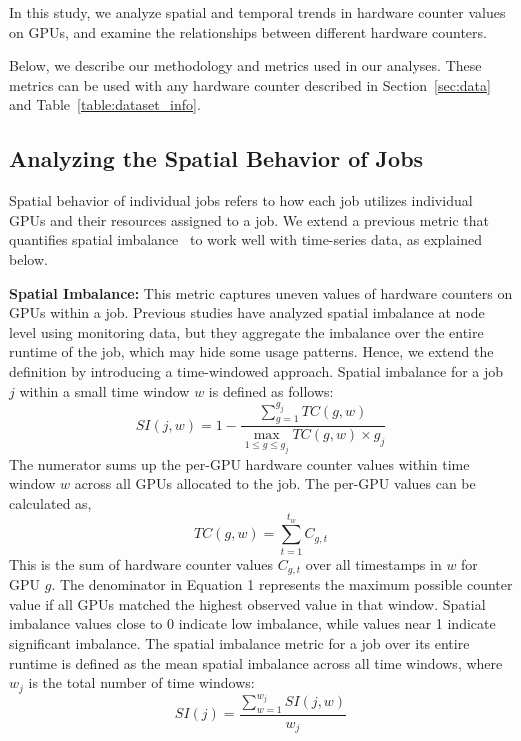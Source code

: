 In this study, we analyze spatial and temporal trends in hardware counter
values on GPUs, and examine the relationships between different hardware counters.

Below, we describe our methodology and metrics used in our analyses. These
metrics can be used with any hardware counter described in
Section~\ref{sec:data} and Table~\ref{table:dataset_info}.

\subsection{Analyzing the Spatial Behavior of Jobs}

Spatial behavior of individual jobs refers to how each job utilizes individual
GPUs and their resources assigned to a job.  We extend a previous metric that
quantifies spatial imbalance~\cite{li2023analyzing, peng2021holistic} to work
well with time-series data, as explained below.

\vspace{0.08in}
\noindent\textbf{Spatial Imbalance:}
This metric captures uneven values of hardware counters on GPUs within a job.
Previous studies have analyzed spatial imbalance at node level using monitoring data, but
they aggregate the imbalance over the entire runtime of the job, which may hide
some usage patterns.  Hence, we extend the definition by introducing a time-windowed
approach.  Spatial imbalance for a job $j$ within a small time window $w$ is defined
as follows:
%
\begin{equation}
    \mathit{SI}(j, w) = 1 - \frac{\sum_{g=1}^{g_j} \mathit{TC}(g,w)}{\max\limits_{1 \leq g \leq g_j} \mathit{TC}(g,w) \times g_j}
\end{equation}
%
The numerator sums up the per-GPU hardware counter values within
time window $w$ across all GPUs allocated to the job. The per-GPU values can be calculated as,
%
\[
    \mathit{TC}(g,w) = \sum_{t=1}^{t_w} C_{g,t}
\]
%
This is the sum of hardware counter values $C_{g,t}$ over all timestamps in $w$ for
GPU $g$.  The denominator in Equation 1 represents the maximum possible
counter value if all GPUs matched the highest observed value in that
window.  Spatial imbalance values close to 0 indicate low imbalance,
while values near 1 indicate significant imbalance.  The spatial imbalance
metric for a job over its entire runtime is defined as the mean spatial
imbalance across all time windows, where $w_j$ is the total number of time
windows:
%
\begin{equation}
    \mathit{SI}(j) = \frac{\sum_{w=1}^{w_j} \mathit{SI}(j, w)}{w_j}
\end{equation}

